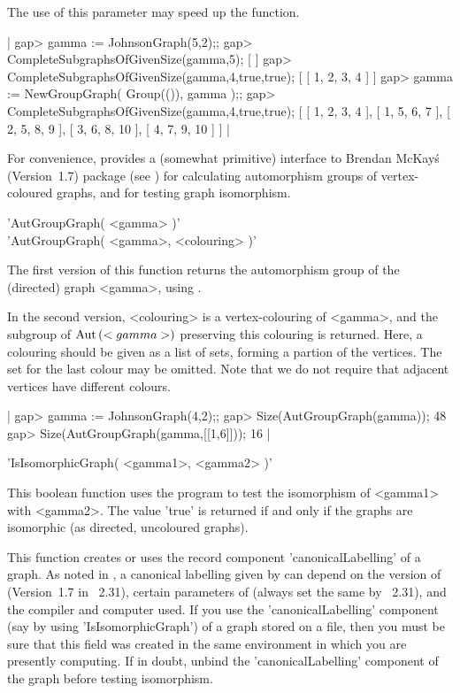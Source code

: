 The use of this parameter may speed up the function.

|    gap> gamma := JohnsonGraph(5,2);;
    gap> CompleteSubgraphsOfGivenSize(gamma,5);
    [  ]
    gap> CompleteSubgraphsOfGivenSize(gamma,4,true,true);
    [ [ 1, 2, 3, 4 ] ]
    gap> gamma := NewGroupGraph( Group(()), gamma );;
    gap> CompleteSubgraphsOfGivenSize(gamma,4,true,true);
    [ [ 1, 2, 3, 4 ], [ 1, 5, 6, 7 ], [ 2, 5, 8, 9 ], [ 3, 6, 8, 10 ],
      [ 4, 7, 9, 10 ] ] |


For convenience,  {\GRAPE} provides  a (somewhat primitive)  interface to
Brendan  McKay\'s  {\nauty} (Version~1.7) package  (see \cite{Nau90}) for
calculating  automorphism  groups  of vertex-coloured  graphs,   and  for
testing graph isomorphism.


'AutGroupGraph( <gamma> )' \\
'AutGroupGraph( <gamma>, <colouring> )'

The first version of this function returns the  automorphism group of the
(directed) graph <gamma>, using {\nauty}.

In the second version, <colouring> is a vertex-colouring  of <gamma>, and
the subgroup of ${\rm Aut}\,(<gamma>)$ preserving this  colouring  is  returned.
Here, a colouring should be given as a list of sets, forming a partion of
the vertices.   The  set for the last colour may be omitted. Note that we
do not require that adjacent vertices have different colours.

|    gap> gamma := JohnsonGraph(4,2);;
    gap> Size(AutGroupGraph(gamma));
    48
    gap> Size(AutGroupGraph(gamma,[[1,6]]));
    16 |


'IsIsomorphicGraph( <gamma1>, <gamma2> )'

This boolean function  uses the {\nauty} program  to test the isomorphism
of <gamma1>  with <gamma2>.  The value 'true' is  returned if and only if
the graphs are isomorphic (as directed, uncoloured graphs).

This  function creates or  uses the record component 'canonicalLabelling'
of a graph.  As noted  in \cite{Nau90}, a  canonical  labelling given  by
{\nauty}  can  depend   on  the version   of  {\nauty}  (Version~1.7   in
{\GRAPE}~2.31),  certain parameters of  {\nauty}  (always set the same by 
{\GRAPE}~2.31),  and  the  compiler  and  computer  used.  If you use the 
'canonicalLabelling' component  (say by using  'IsIsomorphicGraph')  of a 
graph stored on a file, then you must be sure that this field was created 
in the same environment in which you are presently computing. If in doubt,  
unbind the 'canonicalLabelling' component  of  the  graph  before  testing 
isomorphism.

